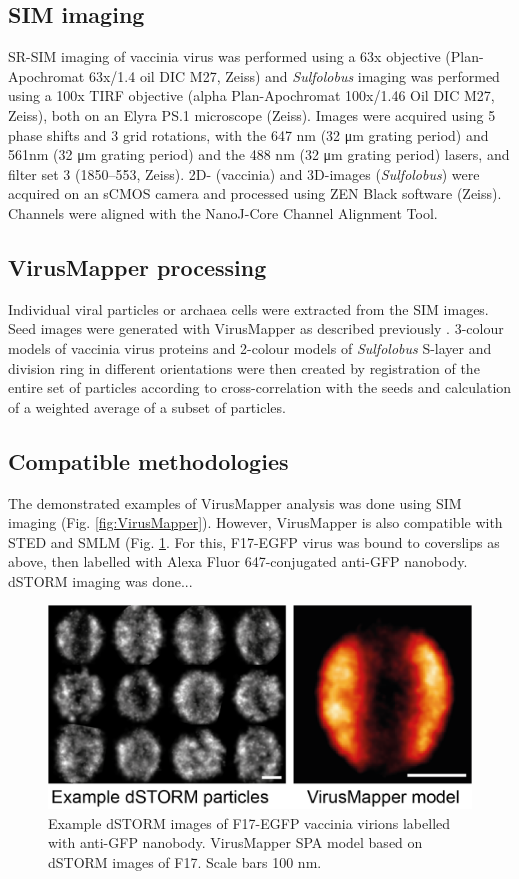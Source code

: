 \subsection{SIM imaging}

SR-SIM imaging of vaccinia virus was performed using a 63x objective (Plan-Apochromat 63x/1.4 oil DIC M27, Zeiss) and \emph{Sulfolobus} imaging was performed using a 100x TIRF objective (alpha Plan-Apochromat 100x/1.46 Oil DIC M27, Zeiss), both on an Elyra PS.1 microscope (Zeiss). Images were acquired using 5 phase shifts and 3 grid rotations, with the 647 nm (32 μm grating period) and 561nm (32 μm grating period) and the 488 nm (32 μm grating period) lasers, and filter set 3 (1850–553, Zeiss). 2D- (vaccinia) and 3D-images (\textit{Sulfolobus}) were acquired on an sCMOS camera and processed using ZEN Black software (Zeiss). Channels were aligned with the NanoJ-Core Channel Alignment Tool.
 
\subsection{VirusMapper processing}

Individual viral particles or archaea cells were extracted from the SIM images. Seed images were generated with VirusMapper as described previously \cite{Gray2016}. 3-colour models of vaccinia virus proteins and 2-colour models of \emph{Sulfolobus} S-layer and division ring in different orientations were then created by registration of the entire set of particles according to cross-correlation with the seeds and calculation of a weighted average of a subset of particles.

\subsection{Compatible methodologies}

The demonstrated examples of VirusMapper analysis was done using SIM imaging (Fig. \ref{fig:VirusMapper}). However, VirusMapper is also compatible with STED \cite{gray2017open} and SMLM (Fig. \ref{fig:supVM}. For this, F17-EGFP virus was bound to coverslips as above, then labelled with Alexa Fluor 647-conjugated anti-GFP nanobody. dSTORM imaging was done...

\begin{figure}
    \centering
    \includegraphics{Figures/dSTORM_Sup.png}
    \caption{Example dSTORM images of F17-EGFP vaccinia virions labelled with anti-GFP nanobody. VirusMapper SPA model based on dSTORM images of F17. Scale bars 100 nm.}
    \label{fig:supVM}
\end{figure}


